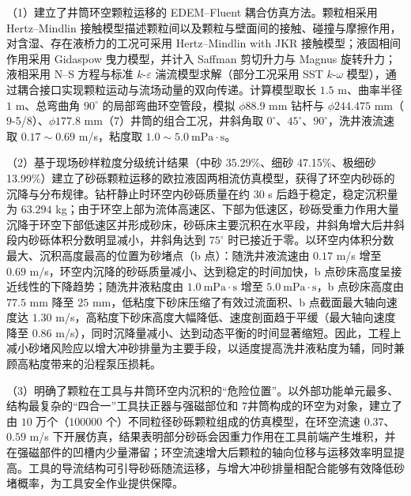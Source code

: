 （1）建立了井筒环空颗粒运移的 EDEM--Fluent 耦合仿真方法。颗粒相采用 Hertz--Mindlin 接触模型描述颗粒间以及颗粒与壁面间的接触、碰撞与摩擦作用，对含湿、存在液桥力的工况可采用 Hertz--Mindlin with JKR 接触模型；液固相间作用采用 Gidaspow 曳力模型，并计入 Saffman 剪切升力与 Magnus 旋转升力；液相采用 N--S 方程与标准 $k$-$\varepsilon$ 湍流模型求解（部分工况采用 SST $k$-$\omega$ 模型），通过耦合接口实现颗粒运动与流场动量的双向传递。计算模型取长 $1.5$ m、曲率半径 $1$ m、总弯曲角 $90^\circ$ 的局部弯曲环空管段，模拟 $\phi 88.9$ mm 钻杆与 $\phi 244.475$ mm（$9$-5/8\inch）、$\phi 177.8$ mm（$7$\inch）井筒的组合工况，井斜角取 $0^\circ$、$45^\circ$、$90^\circ$，洗井液流速取 $0.17\sim0.69$ m/s，粘度取 $1.0\sim5.0\ \mathrm{mPa}\cdot\mathrm{s}$。

（2）基于现场砂样粒度分级统计结果（中砂 35.29\%、细砂 47.15\%、极细砂 13.99\%）建立了砂砾颗粒运移的欧拉液固两相流仿真模型，获得了环空内砂砾的沉降与分布规律。钻杆静止时环空内砂砾质量在约 $30$ s 后趋于稳定，稳定沉积量为 $63.294$ kg；由于环空上部为流体高速区、下部为低速区，砂砾受重力作用大量沉降于环空下部低速区并形成砂床，砂砾床主要沉积在水平段，井斜角增大后井斜段内砂砾体积分数明显减小，井斜角达到 $75^\circ$ 时已接近于零。以环空内体积分数最大、沉积高度最高的位置为砂堵点（b 点）：随洗井液流速由 $0.17$ m/s 增至 $0.69$ m/s，环空内沉降的砂砾质量减小、达到稳定的时间加快，b 点砂床高度呈接近线性的下降趋势；随洗井液粘度由 $1.0\ \mathrm{mPa}\cdot\mathrm{s}$ 增至 $5.0\ \mathrm{mPa}\cdot\mathrm{s}$，b 点砂床高度由 $77.5$ mm 降至 $25$ mm，低粘度下砂床压缩了有效过流面积、b 点截面最大轴向速度达 $1.30$ m/s，高粘度下砂床高度大幅降低、速度剖面趋于平缓（最大轴向速度降至 $0.86$ m/s），同时沉降量减小、达到动态平衡的时间显著缩短。因此，工程上减小砂堵风险应以增大冲砂排量为主要手段，以适度提高洗井液粘度为辅，同时兼顾高粘度带来的沿程泵压损耗。

（3）明确了颗粒在工具与井筒环空内沉积的“危险位置”。以外部功能单元最多、结构最复杂的“四合一”工具扶正器与强磁部位和 $7$\inch 井筒构成的环空为对象，建立了由 $10$ 万个（$100000$ 个）不同粒径砂砾颗粒组成的仿真模型，在环空流速 $0.37$、$0.59$ m/s 下开展仿真，结果表明部分砂砾会因重力作用在工具前端产生堆积，并在强磁部件的凹槽内少量滞留；环空流速增大后颗粒的轴向位移与运移效率明显提高。工具的导流结构可引导砂砾随流运移，与增大冲砂排量相配合能够有效降低砂堵概率，为工具安全作业提供保障。

